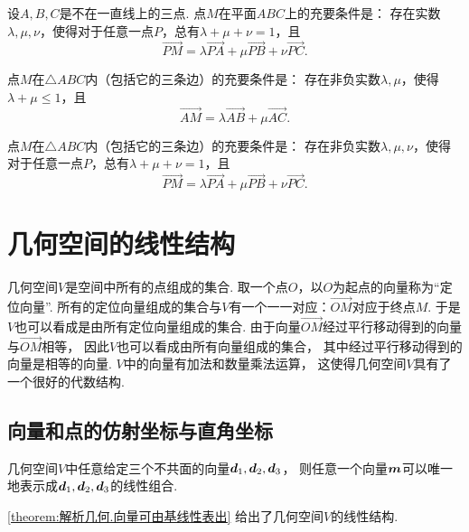 \begin{theorem}
设\(A,B,C\)是不在一直线上的三点.
点\(M\)在平面\(ABC\)上的充要条件是：
存在实数\(\lambda,\mu,\nu\)，使得对于任意一点\(P\)，总有\(\lambda+\mu+\nu=1\)，且\[
\vec{PM} = \lambda \vec{PA} + \mu \vec{PB} + \nu \vec{PC}.
\]
\end{theorem}

\begin{theorem}
点\(M\)在\(\triangle ABC\)内（包括它的三条边）的充要条件是：
存在非负实数\(\lambda,\mu\)，使得\(\lambda+\mu\leqslant1\)，且\[
\vec{AM} = \lambda \vec{AB} + \mu \vec{AC}.
\]
\end{theorem}

\begin{theorem}
点\(M\)在\(\triangle ABC\)内（包括它的三条边）的充要条件是：
存在非负实数\(\lambda,\mu,\nu\)，使得对于任意一点\(P\)，总有\(\lambda+\mu+\nu=1\)，且\[
\vec{PM} = \lambda \vec{PA} + \mu \vec{PB} + \nu \vec{PC}.
\]
\end{theorem}

\section{几何空间的线性结构}
几何空间\(V\)是空间中所有的点组成的集合.
取一个点\(O\)，以\(O\)为起点的向量称为“定位向量”.
所有的定位向量组成的集合与\(V\)有一个一一对应：\(\vec{OM}\)对应于终点\(M\).
于是\(V\)也可以看成是由所有定位向量组成的集合.
由于向量\(\vec{OM}\)经过平行移动得到的向量与\(\vec{OM}\)相等，
因此\(V\)也可以看成由所有向量组成的集合，
其中经过平行移动得到的向量是相等的向量.
\(V\)中的向量有加法和数量乘法运算，
这使得几何空间\(V\)具有了一个很好的代数结构.

\subsection{向量和点的仿射坐标与直角坐标}
\begin{theorem}\label{theorem:解析几何.向量可由基线性表出}
几何空间\(V\)中任意给定三个不共面的向量\(\boldsymbol{d}_1,\boldsymbol{d}_2,\boldsymbol{d}_3\)，
则任意一个向量\(\boldsymbol{m}\)可以唯一地表示成\(\boldsymbol{d}_1,\boldsymbol{d}_2,\boldsymbol{d}_3\)的线性组合.
\end{theorem}
\cref{theorem:解析几何.向量可由基线性表出} 给出了几何空间\(V\)的线性结构.


